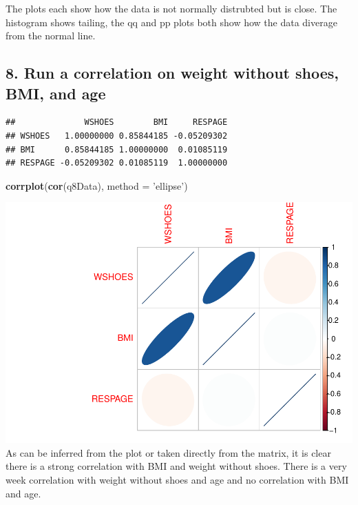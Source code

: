 \documentclass[]{article}
\newenvironment{Shaded}{\begin{snugshade}}{\end{snugshade}}
\newcommand{\DataTypeTok}[1]{\textcolor[rgb]{0.13,0.29,0.53}{#1}}
\newcommand{\KeywordTok}[1]{\textcolor[rgb]{0.13,0.29,0.53}{\textbf{#1}}}
\newcommand{\NormalTok}[1]{#1}
\newcommand{\OperatorTok}[1]{\textcolor[rgb]{0.81,0.36,0.00}{\textbf{#1}}}
\newcommand{\StringTok}[1]{\textcolor[rgb]{0.31,0.60,0.02}{#1}}
\begin{document}
The plots each show how the data is not normally distrubted but is
close. The histogram shows tailing, the qq and pp plots both show how
the data diverage from the normal line.

\hypertarget{run-a-correlation-on-weight-without-shoes-bmi-and-age}{%
\subsection{8. Run a correlation on weight without shoes, BMI, and
age}\label{run-a-correlation-on-weight-without-shoes-bmi-and-age}}

\begin{Shaded}
\end{Shaded}

\begin{verbatim}
##              WSHOES        BMI     RESPAGE
## WSHOES   1.00000000 0.85844185 -0.05209302
## BMI      0.85844185 1.00000000  0.01085119
## RESPAGE -0.05209302 0.01085119  1.00000000
\end{verbatim}

\begin{Shaded}
\begin{Highlighting}[]
\KeywordTok{corrplot}\NormalTok{(}\KeywordTok{cor}\NormalTok{(q8Data), }\DataTypeTok{method =} \StringTok{'ellipse'}\NormalTok{)}
\end{Highlighting}
\end{Shaded}

\includegraphics{assignment2_files/figure-latex/q8-1.pdf} As can be
inferred from the plot or taken directly from the matrix, it is clear
there is a strong correlation with BMI and weight without shoes. There
is a very week correlation with weight without shoes and age and no
correlation with BMI and age.
\end{document}
